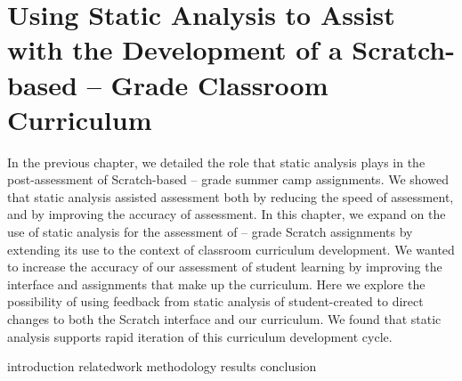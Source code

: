\chapter{Using Static Analysis to Assist with the Development of a
  Scratch-based -- Grade Classroom Curriculum}
\label{chap:curriculum}

\def\currentprefix{curriculum}

In the previous chapter, we detailed the role that static analysis plays in the
post-assessment of Scratch-based -- grade summer camp
assignments. We showed that static analysis assisted assessment both by
reducing the speed of assessment, and by improving the accuracy of
assessment. In this chapter, we expand on the use of static analysis for the
assessment of -- grade Scratch assignments by extending its use
to the context of classroom curriculum development. We wanted to increase the
accuracy of our assessment of student learning by improving the interface and
assignments that make up the curriculum. Here we explore the possibility of
using feedback from static analysis of student-created  to direct
changes to both the Scratch interface and our curriculum. We found that static
analysis supports rapid iteration of this curriculum development cycle.

\iffull
{introduction}
{relatedwork}
{methodology}
{results}
{conclusion}
\fi
